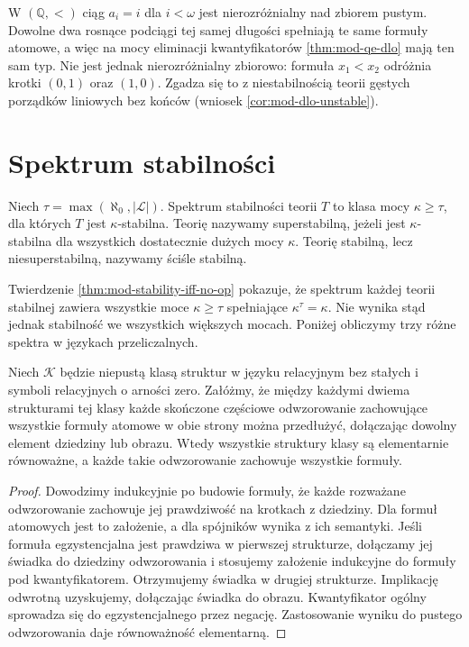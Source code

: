 \begin{przyklad}
\label{ex:mod-dlo-indiscernible}
W $(\mathbb Q,<)$ ciąg $a_i=i$ dla $i<\omega$
jest nierozróżnialny nad zbiorem pustym.
Dowolne dwa rosnące podciągi tej samej długości
spełniają te same formuły atomowe, a więc
na mocy eliminacji kwantyfikatorów
\ref{thm:mod-qe-dlo} mają ten sam typ.
Nie jest jednak nierozróżnialny zbiorowo:
formuła $x_1<x_2$ odróżnia krotki $(0,1)$
oraz $(1,0)$. Zgadza się to z niestabilnością
teorii gęstych porządków liniowych bez końców
(wniosek \ref{cor:mod-dlo-unstable}).
\end{przyklad}

\section{Spektrum stabilności}

\begin{definicja}
\label{def:mod-stability-spectrum}
Niech $\tau=\max(\aleph_0,|\mathcal L|)$.
Spektrum stabilności teorii $T$ to klasa mocy
$\kappa\geq\tau$, dla których $T$ jest
$\kappa$-stabilna.
Teorię nazywamy superstabilną, jeżeli jest
$\kappa$-stabilna dla wszystkich dostatecznie
dużych mocy $\kappa$.
Teorię stabilną, lecz niesuperstabilną,
nazywamy ściśle stabilną.
\end{definicja}

Twierdzenie \ref{thm:mod-stability-iff-no-op}
pokazuje, że spektrum każdej teorii stabilnej
zawiera wszystkie moce $\kappa\geq\tau$
spełniające $\kappa^\tau=\kappa$. Nie wynika
stąd jednak stabilność we wszystkich większych
mocach. Poniżej obliczymy trzy różne spektra
w językach przeliczalnych.

\begin{lemat}
\label{lem:mod-spectrum-finite-back-forth}
Niech $\mathcal K$ będzie niepustą klasą struktur
w języku relacyjnym bez stałych i symboli
relacyjnych o arności zero. Załóżmy, że między każdymi
dwiema strukturami tej klasy każde skończone
częściowe odwzorowanie zachowujące wszystkie
formuły atomowe w obie strony można przedłużyć,
dołączając dowolny element dziedziny lub obrazu.
Wtedy wszystkie struktury klasy są elementarnie
równoważne, a każde takie odwzorowanie zachowuje
wszystkie formuły.
\end{lemat}
\begin{proof}
Dowodzimy indukcyjnie po budowie formuły,
że każde rozważane odwzorowanie zachowuje
jej prawdziwość na krotkach z dziedziny.
Dla formuł atomowych jest to założenie,
a dla spójników wynika z ich semantyki.
Jeśli formuła egzystencjalna jest prawdziwa
w pierwszej strukturze, dołączamy jej świadka
do dziedziny odwzorowania i stosujemy
założenie indukcyjne do formuły pod kwantyfikatorem.
Otrzymujemy świadka w drugiej strukturze.
Implikację odwrotną uzyskujemy, dołączając
świadka do obrazu. Kwantyfikator ogólny
sprowadza się do egzystencjalnego przez negację.
Zastosowanie wyniku do pustego odwzorowania
daje równoważność elementarną.
\end{proof}

